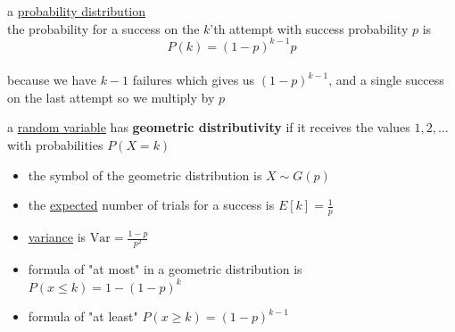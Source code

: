 \documentclass[a4paper,12pt]{article}
\newcommand{\?}{\stackrel{?}{=}}
\begin{document}
\newenvironment{note}
  {\begin{bclogo}[logo=\bcinfo, couleurBarre=orange, couleur=lightgray]{ note}}
  {\end{bclogo}}
\newenvironment{attention}
  {\begin{bclogo}[logo=\bcattention, couleurBarre=red, noborder=true, 
                couleur=red!15]{Important!}}
  {\end{bclogo}}

a \href{20230120140123-probability_distribution.org}{probability distribution}\\[0pt]
the probability for a success on the \(k\)'th attempt with success probability \(p\) is\\[0pt]
\[
P(k) = {(1-p)}^{k-1}p
\]\\[0pt]
because we have \(k-1\) failures which gives us \({(1-p)}^{k-1}\), and a single success on the last attempt so we multiply by \(p\)\\[0pt]
\begin{definition}
a \href{20230104221353-random_variable.org}{random variable} has \textbf{geometric distributivity} if it receives the values \(1,2,\dots\) with probabilities \hyperref[org37cb532]{\(P(X=k)\)}\\[0pt]
\end{definition}
\begin{characteristic}
\begin{itemize}
\item the symbol of the geometric distribution is \(X \sim G(p)\)\\[0pt]
\item the \href{20230121184721-expected_value.org}{expected} number of trials for a success is \(E[k] = \frac{1}{p}\)\\[0pt]
\item \href{20230113164748-variance.org}{variance} is \(\mathrm{Var}=\frac{1-p}{p^2}\)\\[0pt]
\item formula of "at most" in a geometric distribution is \(P(x \le k)=1-(1-p)^k\)\\[0pt]
\item formula of "at least" \(P(x \geq k)=(1-p)^{k-1}\)\\[0pt]
\end{itemize}
\end{characteristic}
\end{document}
